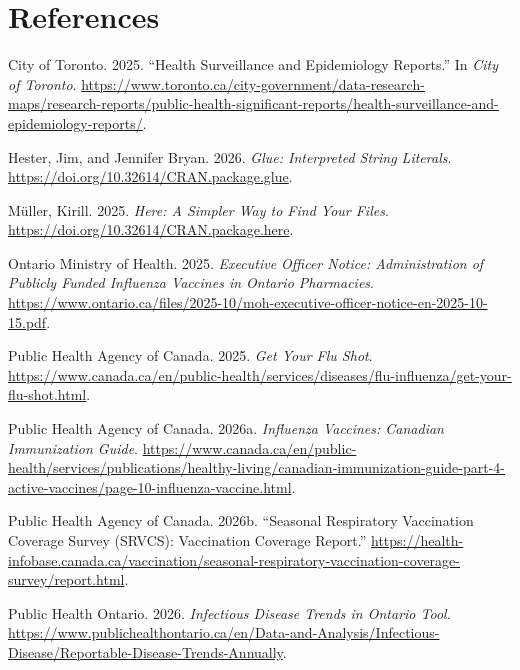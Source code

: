 \documentclass[
  letterpaper,
  DIV=11,
  numbers=noendperiod]{scrartcl}
\newlength{\cslhangindent}
\newenvironment{CSLReferences}[2] %
 {\begin{list}{}{%
  \setlength{\itemindent}{0pt}
  \setlength{\leftmargin}{0pt}
  \setlength{\parsep}{0pt}
  \ifodd #1
   \setlength{\leftmargin}{\cslhangindent}
   \setlength{\itemindent}{-1\cslhangindent}
  \fi
  \setlength{\itemsep}{#2\baselineskip}}}
 {\end{list}}
\begin{document}
\section*{References}\label{references}

\protect{}\label{refs}
\begin{CSLReferences}{1}{1}
City of Toronto. 2025. {``Health Surveillance and Epidemiology
Reports.''} In \emph{City of Toronto}.
\url{https://www.toronto.ca/city-government/data-research-maps/research-reports/public-health-significant-reports/health-surveillance-and-epidemiology-reports/}.

Hester, Jim, and Jennifer Bryan. 2026. \emph{Glue: Interpreted String
Literals}. \url{https://doi.org/10.32614/CRAN.package.glue}.

Müller, Kirill. 2025. \emph{Here: A Simpler Way to Find Your Files}.
\url{https://doi.org/10.32614/CRAN.package.here}.

Ontario Ministry of Health. 2025. \emph{Executive Officer Notice:
Administration of Publicly Funded Influenza Vaccines in Ontario
Pharmacies}.
\url{https://www.ontario.ca/files/2025-10/moh-executive-officer-notice-en-2025-10-15.pdf}.

Public Health Agency of Canada. 2025. \emph{Get Your Flu Shot}.
\url{https://www.canada.ca/en/public-health/services/diseases/flu-influenza/get-your-flu-shot.html}.

Public Health Agency of Canada. 2026a. \emph{Influenza Vaccines:
Canadian Immunization Guide}.
\url{https://www.canada.ca/en/public-health/services/publications/healthy-living/canadian-immunization-guide-part-4-active-vaccines/page-10-influenza-vaccine.html}.

Public Health Agency of Canada. 2026b. {``Seasonal Respiratory
Vaccination Coverage Survey (SRVCS): Vaccination Coverage Report.''}
\url{https://health-infobase.canada.ca/vaccination/seasonal-respiratory-vaccination-coverage-survey/report.html}.

Public Health Ontario. 2026. \emph{Infectious Disease Trends in Ontario
Tool}.
\url{https://www.publichealthontario.ca/en/Data-and-Analysis/Infectious-Disease/Reportable-Disease-Trends-Annually}.


\end{CSLReferences}
\end{document}
